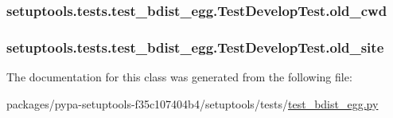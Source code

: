 \subsubsection[{old\+\_\+cwd}]{\setlength{\rightskip}{0pt plus 5cm}setuptools.\+tests.\+test\+\_\+bdist\+\_\+egg.\+Test\+Develop\+Test.\+old\+\_\+cwd}\label{classsetuptools_1_1tests_1_1test__bdist__egg_1_1TestDevelopTest_ad318c0a4753477eeade86fb4444f4175}
\hypertarget{classsetuptools_1_1tests_1_1test__bdist__egg_1_1TestDevelopTest_a65b00431053def3c13d1044b4d8af8cb}{}
\subsubsection[{old\+\_\+site}]{\setlength{\rightskip}{0pt plus 5cm}setuptools.\+tests.\+test\+\_\+bdist\+\_\+egg.\+Test\+Develop\+Test.\+old\+\_\+site}\label{classsetuptools_1_1tests_1_1test__bdist__egg_1_1TestDevelopTest_a65b00431053def3c13d1044b4d8af8cb}


The documentation for this class was generated from the following file\+:\begin{DoxyCompactItemize}
\item 
packages/pypa-\/setuptools-\/f35c107404b4/setuptools/tests/\hyperlink{test__bdist__egg_8py}{test\+\_\+bdist\+\_\+egg.\+py}\end{DoxyCompactItemize}
